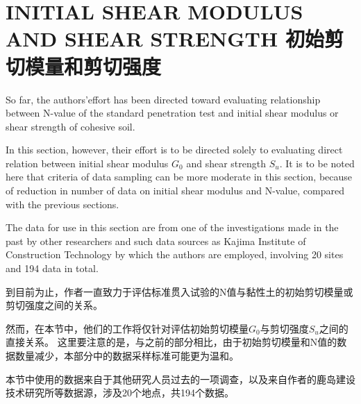 \section{INITIAL SHEAR MODULUS AND SHEAR STRENGTH 初始剪切模量和剪切强度}

\begin{paracol}{2}
    
    So far, the authors'effort has been directed toward evaluating relationship between N-value of the standard penetration test and initial shear modulus or shear strength of cohesive soil.
    
    In this section, however, their effort is to be directed solely to evaluating direct relation between initial shear modulus $G_0$ and shear strength $S_u$. It is to be noted here that criteria of data sampling can be more moderate in this section, because of reduction in number of data on initial shear modulus and N-value, compared with the previous sections.
    
    The data for use in this section are from one of the investigations made in the past by other researchers\citet{Shima19681301, Shima1969819} and such data sources as Kajima Institute of Construction Technology by which the authors are employed, involving 20 sites and 194 data in total.

    \switchcolumn

    到目前为止，作者一直致力于评估标准贯入试验的N值与黏性土的初始剪切模量或剪切强度之间的关系。
            
    然而，在本节中，他们的工作将仅针对评估初始剪切模量$G_0$与剪切强度$S_u$之间的直接关系。 这里要注意的是，与之前的部分相比，由于初始剪切模量和N值的数据数量减少，本部分中的数据采样标准可能更为温和。
            
    本节中使用的数据来自于其他研究人员\citet{Shima19681301, Shima1969819}过去的一项调查，以及来自作者的鹿岛建设技术研究所等数据源，涉及20个地点，共194个数据。
    
\end{paracol}



